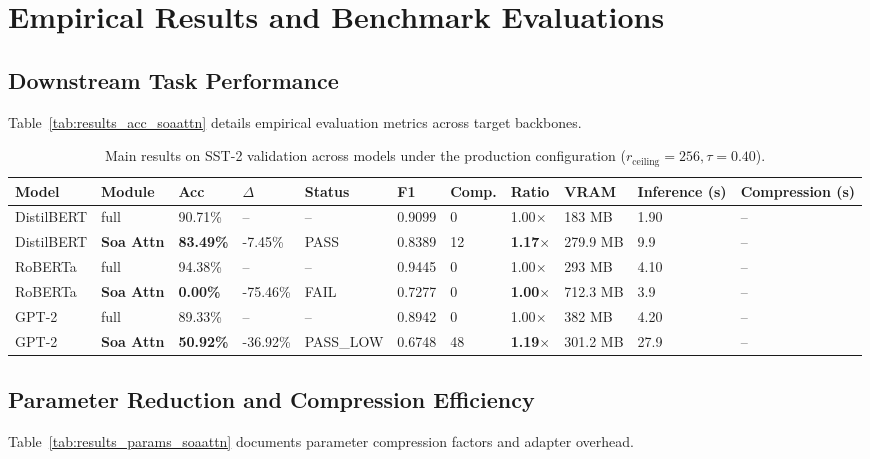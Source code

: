 \section{Empirical Results and Benchmark Evaluations}

\subsection{Downstream Task Performance}
Table~\ref{tab:results_acc_soaattn} details empirical evaluation metrics across target backbones.

\begin{table}[t]
\centering
\small
\begin{tabular}{lllllllllll}
\toprule
\textbf{Model} & \textbf{Module} & \textbf{Acc} & \textbf{$\Delta$} & \textbf{Status} & \textbf{F1} & \textbf{Comp.} & \textbf{Ratio} & \textbf{VRAM} & \textbf{Inference (s)} & \textbf{Compression (s)} \\
\midrule
DistilBERT & full & 90.71\% & -- & -- & 0.9099 & 0 & 1.00$\times$ & 183 MB & 1.90 & -- \\
DistilBERT & \textbf{Soa Attn} & \textbf{83.49\%} & -7.45\% & PASS & 0.8389 & 12 & \textbf{1.17$\times$} & 279.9 MB & 9.9 & -- \\
RoBERTa & full & 94.38\% & -- & -- & 0.9445 & 0 & 1.00$\times$ & 293 MB & 4.10 & -- \\
RoBERTa & \textbf{Soa Attn} & \textbf{0.00\%} & -75.46\% & FAIL & 0.7277 & 0 & \textbf{1.00$\times$} & 712.3 MB & 3.9 & -- \\
GPT-2 & full & 89.33\% & -- & -- & 0.8942 & 0 & 1.00$\times$ & 382 MB & 4.20 & -- \\
GPT-2 & \textbf{Soa Attn} & \textbf{50.92\%} & -36.92\% & PASS_LOW & 0.6748 & 48 & \textbf{1.19$\times$} & 301.2 MB & 27.9 & -- \\
\bottomrule
\end{tabular}
\caption{Main results on SST-2 validation across models under the production configuration ($r_{\mathrm{ceiling}}=256, \tau=0.40$).}
\label{tab:main_sst2}
\end{table}

\subsection{Parameter Reduction and Compression Efficiency}
Table~\ref{tab:results_params_soaattn} documents parameter compression factors and adapter overhead.

